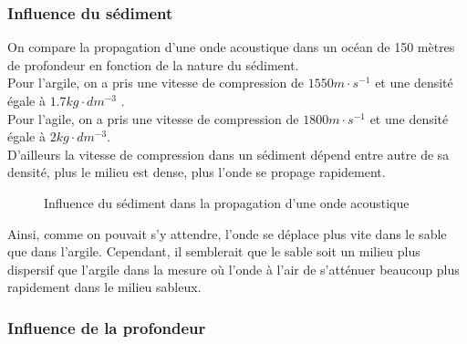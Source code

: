 \documentclass{rapportECC}
\begin{document}
\subsubsection{Influence du sédiment}
On  compare la propagation d'une onde acoustique dans un océan de 150 mètres de profondeur en fonction de la nature du sédiment. \\
Pour l'argile, on a pris une vitesse de compression de $1550 m \cdot s^{-1}$ et une densité égale à $1.7 kg \cdot dm^{-3}$ .
\\
Pour l'agile, on a pris une vitesse de compression de $1800 m \cdot s^{-1}$ et une densité égale à $2 kg \cdot dm^{-3}$. \\
D'ailleurs la vitesse de compression dans un sédiment dépend entre autre de sa densité, plus le milieu est dense, plus l'onde se propage rapidement.
\begin{figure}[H]
    \centering
    \label{fig:image1}\hfill
    \caption{Influence du sédiment dans la propagation d'une onde acoustique}
    \label{fig:images_cote_a_cote}
\end{figure}
Ainsi, comme on pouvait s'y attendre, l'onde se déplace plus vite dans le sable que dans l'argile. Cependant, il semblerait que le sable soit un milieu plus dispersif que l'argile dans la mesure où l'onde à l'air de s'atténuer beaucoup plus rapidement dans le milieu sableux.

\subsubsection{Influence de la profondeur}
\end{document}

